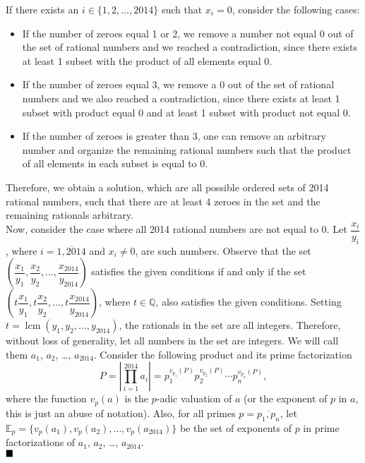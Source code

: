 \documentclass[11pt]{article}
\DeclareMathOperator{\lcm}{lcm}
\newenvironment{solution}[1][Solution]{%
  \proof[\normalfont \faPenNib \hspace{0.2cm} \ttfamily \scshape \large #1]%
}{\(\hfill \blacksquare\){\parfillskip0pt\par}}
\theoremstyle{definition}
\begin{document}
        \begin{solution}
            If there exists an \(i \in \{1,2,\dots,2014\}\) such that \(x_i = 0\), consider the following cases:
            \begin{itemize}
                \item If the number of zeroes equal 1 or 2, we remove a number not equal 0 out of the set of rational numbers and we reached a contradiction, since there exists at least 1 subset with the product of all elements equal 0.
                \item If the number of zeroes equal 3, we remove a 0 out of the set of rational numbers and we also reached a contradiction, since there exists at least 1 subset with product equal 0 and at least 1 subset with product not equal 0.
                \item If the number of zeroes is greater than 3, one can remove an arbitrary number and organize the remaining rational numbers such that the product of all elements in each subset is equal to 0.
            \end{itemize}
            Therefore, we obtain a solution, which are all possible ordered sets of 2014 rational numbers, such that there are at least 4 zeroes in the set and the remaining rationals arbitrary.\\
            Now, consider the case where all 2014 rational numbers are not equal to 0. Let \(\dfrac{x_i}{y_i}\), where \(i = \overline{1,2014}\) and \(x_i \neq 0\), are such numbers. Observe that the set \(\left(\dfrac{x_1}{y_1}, \dfrac{x_2}{y_2}, \dots, \dfrac{x_{2014}}{y_{2014}}\right)\) satisfies the given conditions if and only if the set \(\left(t\dfrac{x_1}{y_1}, t\dfrac{x_2}{y_2}, \dots, t\dfrac{x_{2014}}{y_{2014}}\right)\), where \(t \in \mathbb{Q}\), also satisfies the given conditions. Setting \(t = \lcm (y_1, y_2, \dots, y_{2014})\), the rationals in the set are all integers. Therefore, without loss of generality, let all numbers in the set are integers. We will call them \(a_1\), \(a_2\), \dots, \(a_{2014}\). Consider the following product and its prime factorization
            \[P = \left| \prod_{i=1}^{2014} a_i \right| = p_1^{v_{p_1}(P)} p_2^{v_{p_2}(P)} \cdots p_n^{v_{p_n}(P)},\]
            where the function \(v_p(a)\) is the \(p\)-adic valuation of \(a\) (or the exponent of \(p\) in \(a\), this is just an abuse of notation). Also, for all primes \(p = \overline{p_1,p_n}\), let \(\mathbb{E}_p = \{v_p(a_1), v_p(a_2), \dots, v_p(a_{2014})\}\) be the set of exponents of \(p\) in prime factorizations of \(a_1\), \(a_2\), \dots, \(a_{2014}\).\\

\end{solution}
\end{document}
